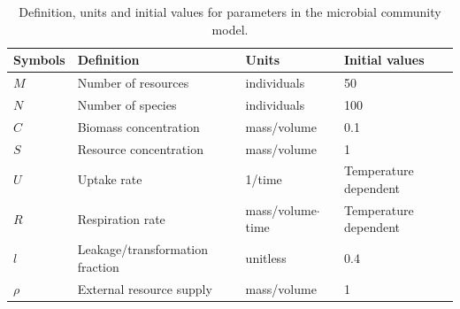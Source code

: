 \documentclass[11pt, a4paper]{article}
\begin{document}
\begin{spacing}{1.5}
\begin{table}
    \caption{Definition, units and initial values for parameters in the microbial community model. }
    \centering
    \begin{tabular}{ |m{1.5cm}<{\centering}|m{6cm}<{\centering}|m{3.5cm}<{\centering}|m{4.3cm}<{\centering}| } 
    \hline
     Symbols & Definition & Units & Initial values \\
     \hline
     $M$ & Number of resources & individuals & 50 \\ 
     $N$ & Number of species & individuals & 100 \\
     $C$ & Biomass concentration & mass/volume & 0.1 \\
     $S$ & Resource concentration & mass/volume & 1 \\
     $U$ & Uptake rate & 1/time & Temperature dependent \\
     $R$ & Respiration rate & mass/volume$\cdot$time & Temperature dependent \\
     $l$ & Leakage/transformation fraction & unitless & 0.4 \\
     $\rho$ & External resource supply & mass/volume & 1 \\
    \hline
    \end{tabular}    
    \label{tab:parameters}
\end{table}


\end{spacing}
\end{document}
